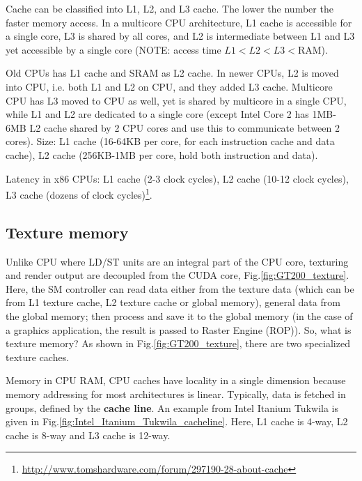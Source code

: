 Cache can be classified into L1, L2, and L3 cache. The lower the number the
faster memory access. In a multicore CPU architecture, L1 cache is accessible
for a single core, L3 is shared by all cores, and L2 is intermediate between L1
and L3 yet accessible by a single core (NOTE: access time $L1<L2<L3<$RAM).

\begin{mdframed}

Old CPUs has L1 cache and SRAM as L2 cache. In newer CPUs, L2 is moved into CPU,
i.e. both L1 and L2 on CPU, and they added L3 cache. Multicore CPU has L3 moved
to CPU as well, yet is shared by multicore in a single CPU, while L1 and L2 are
dedicated to a single core (except Intel Core 2 has 1MB-6MB L2 cache shared by 2
CPU cores and use this to communicate between 2 cores). Size: L1 cache (16-64KB
per core, for each instruction cache and data cache), L2 cache (256KB-1MB per
core, hold both  instruction and data).

Latency in x86 CPUs: L1 cache (2-3 clock cycles), L2 cache (10-12 clock cycles),
L3 cache (dozens of clock
cycles)\footnote{\url{http://www.tomshardware.com/forum/297190-28-about-cache}}.
\end{mdframed}

\subsection{Texture memory}

Unlike CPU where LD/ST units are an integral part of the CPU core, texturing and
render output are decoupled from the CUDA core, Fig.\ref{fig:GT200_texture}.
Here, the SM controller can read data either from the texture data (which can
be from L1 texture cache, L2 texture cache or global memory), general data
from the global memory; then process and save it to the global memory (in the
case of a graphics application, the result is passed to Raster Engine (ROP)).
So, what is texture memory? As shown in Fig.\ref{fig:GT200_texture}, there are
two specialized texture caches.

Memory in CPU RAM, CPU caches have locality in a single dimension because memory
addressing for most architectures is linear. Typically, data is fetched in
groups, defined by the {\bf cache line}. An example from Intel Itanium Tukwila
is given in Fig.\ref{fig:Intel_Itanium_Tukwila_cacheline}. Here, L1 cache is
4-way, L2 cache is 8-way and L3 cache is 12-way.

